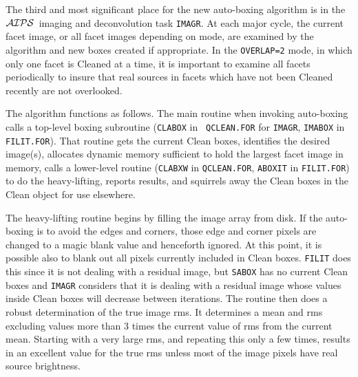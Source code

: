\documentclass[twoside]{article}
\newcommand{\AIPS}{{$\cal AIPS\/$}}
\begin{document}
The third and most significant place for the new auto-boxing algorithm
is in the \AIPS\ imaging and deconvolution task {\tt IMAGR}\@.  At
each major cycle, the current facet image, or all facet images
depending on mode, are examined by the algorithm and new boxes created
if appropriate.  In the {\tt OVERLAP=2} mode, in which only one facet
is Cleaned at a time, it is important to examine all facets
periodically to insure that real sources in facets which have not been
Cleaned recently are not overlooked.

The algorithm functions as follows.  The main routine when invoking
auto-boxing calls a top-level boxing subroutine ({\tt CLABOX} in {\tt
  QCLEAN.FOR} for {\tt IMAGR}, {\tt IMABOX} in {\tt FILIT.FOR}).  That
routine gets the current Clean boxes, identifies the desired image(s),
allocates dynamic memory sufficient to hold the largest facet image in
memory, calls a lower-level routine ({\tt CLABXW} in {\tt QCLEAN.FOR},
{\tt ABOXIT} in {\tt FILIT.FOR}) to do the heavy-lifting, reports
results, and squirrels away the Clean boxes in the Clean object for
use elsewhere.

The heavy-lifting routine begins by filling the image array from
disk.  If the auto-boxing is to avoid the edges and corners, those
edge and corner pixels are changed to a magic blank value and
henceforth ignored.  At this point, it is possible also to blank out
all pixels currently included in Clean boxes.  {\tt FILIT} does this
since it is not dealing with a residual image, but {\tt SABOX} has no
current Clean boxes and {\tt IMAGR} considers that it is dealing with
a residual image whose values inside Clean boxes will decrease between
iterations.  The routine then does a robust determination of the true
image rms.  It determines a mean and rms excluding values more than 3
times the current value of rms from the current mean.  Starting with a
very large rms, and repeating this only a few times, results in an
excellent value for the true rms unless most of the image pixels have
real source brightness.
\end{document}

